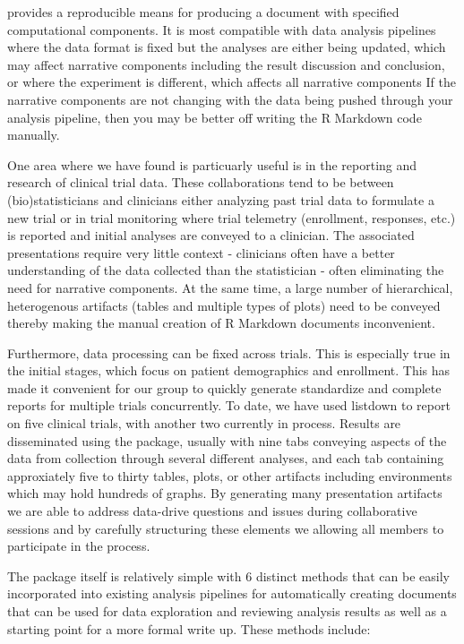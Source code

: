  provides a reproducible means for producing a document
with specified computational components. It is most compatible with data
analysis pipelines where the data format is fixed but the analyses are
either being updated, which may affect narrative components including
the result discussion and conclusion, or where the experiment is
different, which affects all narrative components If the narrative
components are not changing with the data being pushed through your
analysis pipeline, then you may be better off writing the R Markdown
code manually.

One area where we have found  is particuarly useful is in
the reporting and research of clinical trial data. These collaborations
tend to be between (bio)statisticians and clinicians either analyzing
past trial data to formulate a new trial or in trial monitoring where
trial telemetry (enrollment, responses, etc.) is reported and initial
analyses are conveyed to a clinician. The associated presentations
require very little context - clinicians often have a better
understanding of the data collected than the statistician - often
eliminating the need for narrative components. At the same time, a large
number of hierarchical, heterogenous artifacts (tables and multiple
types of plots) need to be conveyed thereby making the manual creation
of R Markdown documents inconvenient.

Furthermore, data processing can be fixed across trials. This is
especially true in the initial stages, which focus on patient
demographics and enrollment. This has made it convenient for our group
to quickly generate standardize and complete reports for multiple trials
concurrently. To date, we have used listdown to report on five clinical
trials, with another two currently in process. Results are disseminated
using the  package, usually with nine tabs conveying
aspects of the data from collection through several different analyses,
and each tab containing approxiately five to thirty tables, plots, or
other artifacts including  \citep{trelliscopejs}
environments which may hold hundreds of graphs. By generating many
presentation artifacts we are able to address data-drive questions and
issues during collaborative sessions and by carefully structuring these
elements we allowing all members to participate in the process.

The  package itself is relatively simple with 6 distinct
methods that can be easily incorporated into existing analysis pipelines
for automatically creating documents that can be used for data
exploration and reviewing analysis results as well as a starting point
for a more formal write up. These methods include:

